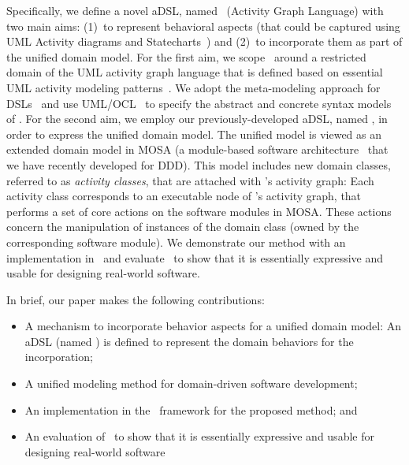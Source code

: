 Specifically, we define a novel aDSL, named \agl~(Activity Graph Language) with two main aims: (1)~to represent behavioral aspects (that could be captured using UML Activity diagrams and Statecharts~\cite{omg_unified_2015}) and (2)~to incorporate them as part of the unified domain model. %
For the first aim, we scope \agl~around a restricted domain of the UML activity graph language that is defined based on essential UML activity modeling patterns~\cite{omg_unified_2015}. We adopt the meta-modeling approach for DSLs~\cite{kleppe_software_2008} and use UML/OCL~\cite{omg_unified_2015, omg_object_2014} to specify the abstract and concrete syntax models of \agl. %
For the second aim, we employ our previously-developed aDSL, named \dcsl, in order to express the unified domain model. The unified model is viewed as an extended domain model in MOSA (a module-based software architecture~\cite{le_generative_2018} that we have recently developed for DDD). 
This model includes new domain classes, referred to as \textit{activity classes}, that are attached with \agl's activity graph: Each activity class corresponds to an executable node of \agl's activity graph, that performs a set of core actions on the software modules in MOSA. These actions concern the manipulation of instances of the domain class (owned by the corresponding software module). We demonstrate our method with an implementation in \jdomainapp~and evaluate \agl~to show that it is essentially expressive and usable for designing real-world software.

In brief, our paper makes the following contributions:
%
\begin{itemize}[leftmargin=*]
	\item A mechanism to incorporate behavior aspects for a unified domain model: An aDSL (named \agl) is defined to represent the domain behaviors for the incorporation;
	\item A unified modeling method for domain-driven software development;
	\item An implementation in the \jdomainapp~framework for the proposed method; and
	\item An evaluation of \agl~to show that it is essentially expressive and usable for designing real-world software
\end{itemize}

